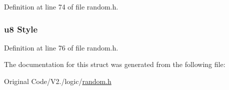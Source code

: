 \-Definition at line 74 of file random.\-h.

\hypertarget{structrandom_a0adf1bc45ebd31c75e1569a65ae60db4}{
\subsubsection[{\-Style}]{\setlength{\rightskip}{0pt plus 5cm}u8 {\bf \-Style}}}\label{structrandom_a0adf1bc45ebd31c75e1569a65ae60db4}


\-Definition at line 76 of file random.\-h.



\-The documentation for this struct was generated from the following file\-:\begin{DoxyCompactItemize}
\item 
\-Original Code/\-V2./logic/\hyperlink{random_8h}{random.\-h}\end{DoxyCompactItemize}
